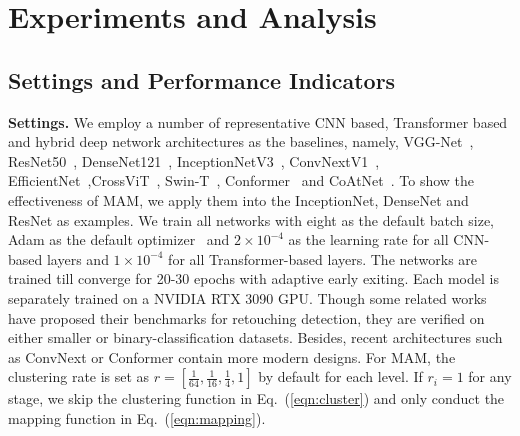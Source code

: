 \documentclass[sigconf]{acmart}
\begin{document}
\section{Experiments and Analysis}
\label{section:experiment}
\subsection{Settings and Performance Indicators}
\noindent\textbf{Settings.}
We employ a number of representative CNN based, Transformer based and hybrid deep network architectures as the baselines,
namely, VGG-Net~\cite{VGG}, ResNet50~\cite{ResNetv2}, DenseNet121~\cite{DenseNet}, InceptionNetV3~\cite{inceptionv2}, ConvNextV1~\cite{ConvNext}, EfficientNet~\cite{tan2019efficientnet},CrossViT~\cite{chen2021crossvit}, Swin-T~\cite{Swin}, Conformer~\cite{conformer} and CoAtNet~\cite{dai2021coatnet}.
To show the effectiveness of MAM, we apply them into the InceptionNet, DenseNet and ResNet as examples.
We train all networks with eight as the default batch size, Adam as the default optimizer~\cite{kingma2014adam} and $2\times10^{-4}$ as the learning rate for all CNN-based layers and $1\times10^{-4}$ for all Transformer-based layers. 
The networks are trained till converge for 20-30 epochs with adaptive early exiting.
Each model is separately trained on a NVIDIA RTX 3090 GPU.
Though some related works~\cite{FFHQWrinkle,shafaei2021autoretouch} have proposed their benchmarks for retouching detection, they are verified on either smaller or binary-classification datasets.
Besides, recent architectures such as ConvNext or Conformer contain more modern designs.
For MAM, the clustering rate is set as $r=[\frac{1}{64},\frac{1}{16},\frac{1}{4},1]$ by default for each level. If $r_i=1$ for any stage, we skip the clustering function in Eq.~(\ref{eqn:cluster}) and only conduct the mapping function in Eq.~(\ref{eqn:mapping}).
\end{document}
